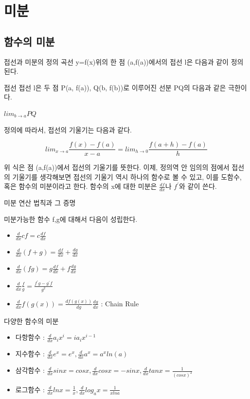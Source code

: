 \documentclass{beamer}
\begin{document}
\section{미분} 

\subsection{함수의 미분} 

\begin{frame}{접선과 미분의 정의 }
곡선 y=f(x)위의 한 점 (a,f(a))에서의 접선 l은 다음과 같이 정의된다. 
\begin{block} {접선} 
접선 l은 두 점 P(a, f(a)), Q(b, f(b))로 이루어진 선분 PQ의 다음과 같은 극한이다. 

$lim_{b \rightarrow a} PQ$ 

\end{block}
정의에 따라서, 접선의 기울기는 다음과 같다. 

\begin{equation} 
lim_{x \rightarrow a} \frac{f(x)-f(a)}{x-a} = lim_{h \rightarrow 0} \frac{f(a+h)-f(a)}{h}
\end{equation}

위 식은 점 (a,f(a))에서 접선의 기울기를 뜻한다. 이제, 정의역 안 임의의 점에서 접선의 기울기를 생각해보면 접선의 기울기 역시 하나의 함수로 볼 수 있고, 이를 도함수, 혹은 함수의 미분이라고 한다. 함수의 x에 대한 미분은 $\frac{df}{dx} $나 $f^{\prime}$와 같이 쓴다. 

\end{frame} 

\begin{frame}{미분 연산 법칙과 그 증명}

미분가능한 함수 f,g에 대해서 다음이 성립한다. 
\begin{itemize} 
\item $\frac{d}{dx} cf = c \frac{df}{dx}$ 
\item $\frac{d}{dx} (f+g) = \frac{df}{dx} + \frac{dg}{dx}$ 
\item $\frac{d}{dx} (fg) = g\frac{df}{dx} + f\frac{dg}{dx}$ 
\item $\frac{d}{dx} \frac{f}{g} = \frac{f^{\prime}g-g^{\prime}f}{g^2}$
\item $\frac{d}{dx} f(g(x)) = \frac{d f(g(x))}{dg} \frac{dg}{dx}$ : Chain Rule 
\end{itemize}
\end{frame} 



\begin{frame}{다양한 함수의 미분}
\begin{itemize} 
\item 다항함수 : $\frac{d}{dx} a_ix^i = ia_ix^{i-1}$
\item 지수함수 : $\frac{d}{dx} e^x = e^x, \frac{d}{dx} a^x = a^x ln(a)$
\item 삼각함수 : $\frac{d}{dx} sin x = cos x , \frac{d}{dx} cos x = - sin x, \frac{d}{dx} tanx = \frac{1}{(cos x)^2} $
\item 로그함수 : $\frac{d}{dx} ln x = \frac{1}{x}, \frac{d}{dx} log_a x = \frac{1}{x ln a}$
\end{itemize}
\end{frame} 
\end{document}
